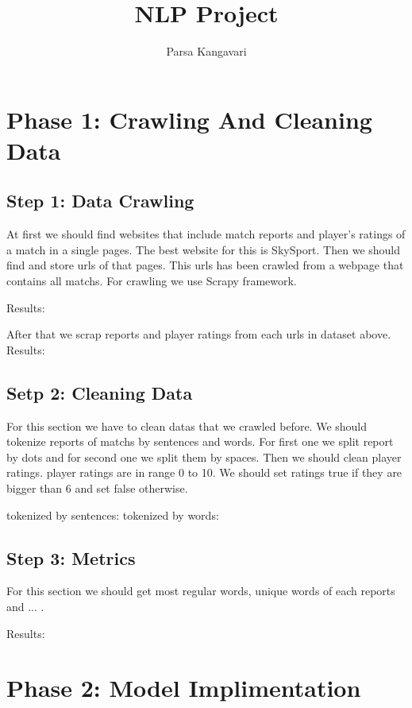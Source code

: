 \documentclass{article}
\title{NLP Project}
\author{Parsa Kangavari}
\begin{document}
 
\maketitle

\section{Phase 1: Crawling And Cleaning Data}
\subsection{Step 1: Data Crawling}
At first we should find websites that include match reports and player's ratings of a match in a single pages. The best website for this is SkySport.
Then we should find and store urls of that pages. This urls has been crawled from a webpage that contains all matchs. For crawling we use Scrapy framework. 

Results:


After that we scrap reports and player ratings from each urls in dataset above.
Results: 

\subsection{Setp 2: Cleaning Data}
For this section we have to clean datas that we crawled before. We should tokenize reports of matchs by sentences and words. 
For first one we split report by dots and for second one we split them by spaces. Then we should clean player ratings. player ratings are in range 0 to 10.
We should set ratings true if they are bigger than 6 and set false otherwise.

tokenized by sentences:
tokenized by words:


\subsection{Step 3: Metrics}
For this section we should get most regular words, unique words of each reports and ... .

Results:
\section{Phase 2: Model Implimentation}
\end{document}
